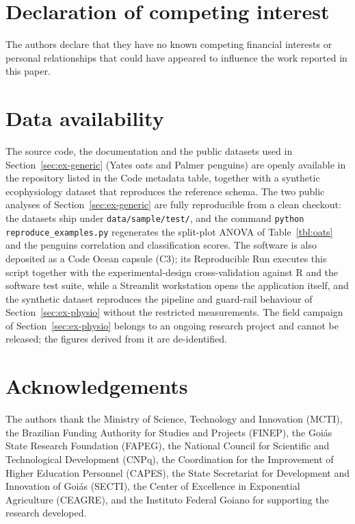 \documentclass[11pt, letterpaper]{article}
\begin{document}
\section*{Declaration of competing interest}
The authors declare that they have no known competing financial interests or personal relationships that could have appeared to influence the work reported in this paper.

\section*{Data availability}
The source code, the documentation and the public datasets used in Section~\ref{sec:ex-generic} (Yates oats and Palmer penguins) are openly available in the repository listed in the Code metadata table, together with a synthetic ecophysiology dataset that reproduces the reference schema. The two public analyses of Section~\ref{sec:ex-generic} are fully reproducible from a clean checkout: the datasets ship under \texttt{data/sample/test/}, and the command \texttt{python reproduce\_examples.py} regenerates the split-plot ANOVA of Table~\ref{tbl:oats} and the penguins correlation and classification scores. The software is also deposited as a Code Ocean capsule (C3); its Reproducible Run executes this script together with the experimental-design cross-validation against R and the software test suite, while a Streamlit workstation opens the application itself, and the synthetic dataset reproduces the pipeline and guard-rail behaviour of Section~\ref{sec:ex-physio} without the restricted measurements. The field campaign of Section~\ref{sec:ex-physio} belongs to an ongoing research project and cannot be released; the figures derived from it are de-identified.

\section*{Acknowledgements}

The authors thank the Ministry of Science, Technology and Innovation (MCTI), the Brazilian Funding Authority for Studies and Projects (FINEP), the Goi\'as State Research Foundation (FAPEG), the National Council for Scientific and Technological Development (CNPq), the Coordination for the Improvement of Higher Education Personnel (CAPES), the State Secretariat for Development and Innovation of Goi\'as (SECTI), the Center of Excellence in Exponential Agriculture (CEAGRE), and the Instituto Federal Goiano for supporting the research developed.
\end{document}
